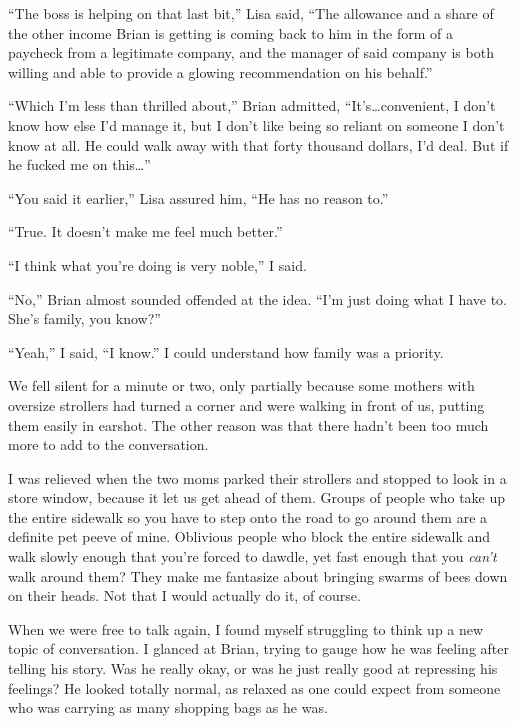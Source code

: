 ``The boss is helping on that last bit,'' Lisa said, ``The allowance and a share of the other income Brian is getting is coming back to him in the form of a paycheck from a legitimate company, and the manager of said company is both willing and able to provide a glowing recommendation on his behalf.''



``Which I'm less than thrilled about,'' Brian admitted, ``It's\ldots convenient, I don't know how else I'd manage it, but I don't like being so reliant on someone I don't know at all.  He could walk away with that forty thousand dollars, I'd deal.  But if he fucked me on this\ldots''



``You said it earlier,'' Lisa assured him, ``He has no reason to.''



``True.  It doesn't make me feel much better.''



``I think what you're doing is very noble,'' I said.



``No,'' Brian almost sounded offended at the idea. ``I'm just doing what I have to.  She's family, you know?''



``Yeah,'' I said, ``I know.''  I could understand how family was a priority.



We fell silent for a minute or two, only partially because some mothers with oversize strollers had turned a corner and were walking in front of us, putting them easily in earshot.  The other reason was that there hadn't been too much more to add to the conversation.



I was relieved when the two moms parked their strollers and stopped to look in a store window, because it let us get ahead of them.  Groups of people who take up the entire sidewalk so you have to step onto the road to go around them are a definite pet peeve of mine.  Oblivious people who block the entire sidewalk and walk slowly enough that you're forced to dawdle, yet fast enough that you \emph{can't} walk around them?  They make me fantasize about bringing swarms of bees down on their heads. Not that I would actually do it, of course.



When we were free to talk again, I found myself struggling to think up a new topic of conversation.  I glanced at Brian, trying to gauge how he was feeling after telling his story.  Was he really okay, or was he just really good at repressing his feelings?  He looked totally normal, as relaxed as one could expect from someone who was carrying as many shopping bags as he was.



